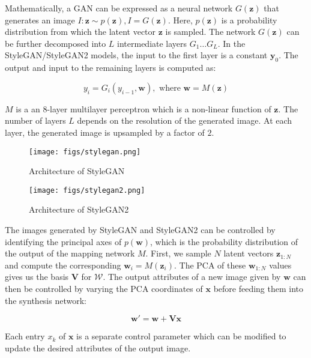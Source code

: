 Mathematically, a GAN can be expressed as a neural network $G(\mathbf{z})$ that generates an image $I: \mathbf{z} \sim p(\mathbf{z}), I = G(\mathbf{z})$. Here, $p(\mathbf{z})$ is a probability distribution from which the latent vector $\mathbf{z}$ is sampled. The network $G(\mathbf{z})$ can be further decomposed into $L$ intermediate layers $G_1\ldots G_L$. In the StyleGAN/StyleGAN2 models, the input to the first layer is a constant $\mathbf{y}_0$. The output and input to the remaining layers is computed as:

\begin{equation}
  y_i = G_i(y_{i-1}, \mathbf{w}),\text{ where }\mathbf{w} = M(\mathbf{z})
\end{equation}

$M$ is a an $8$-layer multilayer perceptron which is a non-linear function of $\mathbf{z}$. The number of layers $L$ depends on the resolution of the generated image. At each layer, the generated image is upsampled by a factor of $2$.

\begin{figure}[H]
  \centering
  \texttt{[image: figs/stylegan.png]}
  \caption{Architecture of StyleGAN\cite{stylegan}}
  \label{fig:stylegan}
\end{figure}

\begin{figure}[H]
  \centering
  \texttt{[image: figs/stylegan2.png]}
  \caption{Architecture of StyleGAN2\cite{stylegan2}}
  \label{fig:stylegan2}
\end{figure}

The images generated by StyleGAN and StyleGAN2 can be controlled by identifying the principal axes of $p(\mathbf{w})$, which is the probability distribution of the output of the mapping network $M$. First, we sample $N$ latent vectors $\mathbf{z}_{1:N}$ and compute the corresponding $\mathbf{w}_{i} = M(\mathbf{z}_{i})$. The PCA of these $\mathbf{w}_{1:N}$ values gives us the basis $\mathbf{V}$ for $\mathcal{W}$. The output attributes of a new image given by $\mathbf{w}$ can then be controlled by varying the PCA coordinates of $\mathbf{x}$ before feeding them into the synthesis network:

\begin{equation}
    \mathbf{w'} = \mathbf{w} + \mathbf{Vx}
\end{equation}

Each entry $x_{k}$ of $\mathbf{x}$ is a separate control parameter which can be modified to update the desired attributes of the output image.

